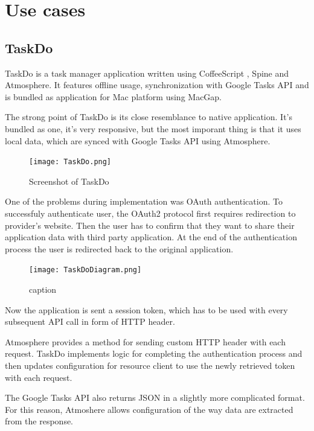 \section{Use cases}

\subsection{TaskDo}

TaskDo \citep{taskdo} is a task manager application written using CoffeeScript \citep{coffeescript}, Spine \citep{spinejs} and Atmosphere. It features offline usage, synchronization with Google Tasks API \citep{google_tasks} and is bundled as application for Mac platform using MacGap. \citep{macgap}

The strong point of TaskDo is its close resemblance to native application. It's bundled as one, it's very responsive, but the most imporant thing is that it uses local data, which are synced with Google Tasks API using Atmosphere.

\begin{figure}[htbp]
  \centering
    \texttt{[image: TaskDo.png]}
  \caption{Screenshot of TaskDo}
  \label{fig:taskdo}
\end{figure}

One of the problems during implementation was OAuth authentication. To successfuly authenticate user, the OAuth2 protocol \citep{oauth} first requires redirection to provider's website. Then the user has to confirm that they want to share their application data with third party application. At the end of the authentication process the user is redirected back to the original application.

\begin{figure}[ht!]
  \centering
    \texttt{[image: TaskDoDiagram.png]}
  \caption{caption}
  \label{fig:taskdo_diagram}
\end{figure}

Now the application is sent a session token, which has to be used with every subsequent API call in form of HTTP header.

Atmosphere provides a method for sending custom HTTP header with each request. TaskDo implements logic for completing the authentication process and then updates configuration for resource client to use the newly retrieved token with each request.

The Google Tasks API also returns JSON in a slightly more complicated format. For this reason, Atmoshere allows configuration of the way data are extracted from the response.

